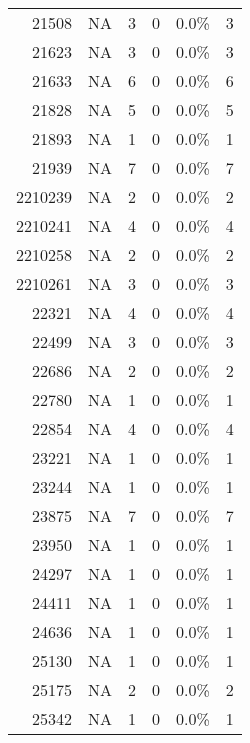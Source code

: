 \begin{longtable}{lrrrrr}
	\multicolumn{1}{r}{21508} & NA    & 3     & 0     & 0.0\% & 3 \\
	\multicolumn{1}{r}{21623} & NA    & 3     & 0     & 0.0\% & 3 \\
	\multicolumn{1}{r}{21633} & NA    & 6     & 0     & 0.0\% & 6 \\
	\multicolumn{1}{r}{21828} & NA    & 5     & 0     & 0.0\% & 5 \\
	\multicolumn{1}{r}{21893} & NA    & 1     & 0     & 0.0\% & 1 \\
	\multicolumn{1}{r}{21939} & NA    & 7     & 0     & 0.0\% & 7 \\
	\multicolumn{1}{r}{2210239} & NA    & 2     & 0     & 0.0\% & 2 \\
	\multicolumn{1}{r}{2210241} & NA    & 4     & 0     & 0.0\% & 4 \\
	\multicolumn{1}{r}{2210258} & NA    & 2     & 0     & 0.0\% & 2 \\
	\multicolumn{1}{r}{2210261} & NA    & 3     & 0     & 0.0\% & 3 \\
	\multicolumn{1}{r}{22321} & NA    & 4     & 0     & 0.0\% & 4 \\
	\multicolumn{1}{r}{22499} & NA    & 3     & 0     & 0.0\% & 3 \\
	\multicolumn{1}{r}{22686} & NA    & 2     & 0     & 0.0\% & 2 \\
	\multicolumn{1}{r}{22780} & NA    & 1     & 0     & 0.0\% & 1 \\
	\multicolumn{1}{r}{22854} & NA    & 4     & 0     & 0.0\% & 4 \\
	\multicolumn{1}{r}{23221} & NA    & 1     & 0     & 0.0\% & 1 \\
	\multicolumn{1}{r}{23244} & NA    & 1     & 0     & 0.0\% & 1 \\
	\multicolumn{1}{r}{23875} & NA    & 7     & 0     & 0.0\% & 7 \\
	\multicolumn{1}{r}{23950} & NA    & 1     & 0     & 0.0\% & 1 \\
	\multicolumn{1}{r}{24297} & NA    & 1     & 0     & 0.0\% & 1 \\
	\multicolumn{1}{r}{24411} & NA    & 1     & 0     & 0.0\% & 1 \\
	\multicolumn{1}{r}{24636} & NA    & 1     & 0     & 0.0\% & 1 \\
	\multicolumn{1}{r}{25130} & NA    & 1     & 0     & 0.0\% & 1 \\
	\multicolumn{1}{r}{25175} & NA    & 2     & 0     & 0.0\% & 2 \\
	\multicolumn{1}{r}{25342} & NA    & 1     & 0     & 0.0\% & 1 \\

\end{longtable}
